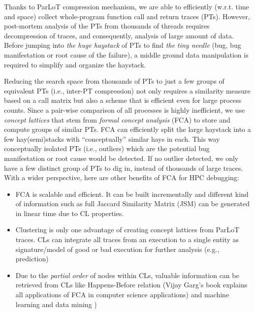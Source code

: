 Thanks to ParLoT compression mechanism, we are able to efficiently (w.r.t. time and space) collect whole-program function call and return traces (PTs). However, post-mortem analysis of the PTs from thousands of threads requires decompression of traces, and consequently, analysis of large amount of data. Before jumping into \textit{the huge haystack} of PTs to find \textit{the tiny needle} (bug, bug manifestation or root cause of the failure), a middle ground data manipulation is required to simplify and organize the haystack. 

Reducing the search space from thousands of PTs to just a few groups of equivalent PTs (i.e., inter-PT compression) not only requires a similarity measure based on a call matrix but also a scheme that is efficient even for large process counts.
%
Since a pair-wise comparison of all processes is highly inefficient, we use \textit{concept lattices} that stem from \textit{formal concept analysis} (FCA) \cite{clbook} to store and compute groups of similar PTs.
%
FCA can efficiently split the large haystack into a few hay(semi)stacks with ``conceptually'' similar hays in each. This way conceptually isolated PTs (i.e., outliers) which are the potential bug manifestation or root cause would be detected. If no outlier detected, we only have a few distinct group of PTs to dig in, instead of thousands of large traces. With a wider perspective, here are other benefits of FCA for HPC debugging:
\begin{itemize}
\item FCA is scalable and efficient. It can be built incrementally and different kind of information such as full Jaccard Similarity Matrix (JSM) can be generated in linear time due to CL properties.
\item Clustering is only one advantage of creating concept lattices from ParLoT traces. CLs can integrate all traces from an execution to a single entity as signature/model of good or bad execution for further analysis (e.g., prediction) 
\item Due to the \textit{partial order} of nodes within CLs, valuable information can be retrieved from CLs like Happens-Before relation (Vijay Garg’s book explains all applications of FCA in computer science applications)\cite{latticeForDistConst} and machine learning and data mining \cite{Ignatov17})
\end{itemize}

